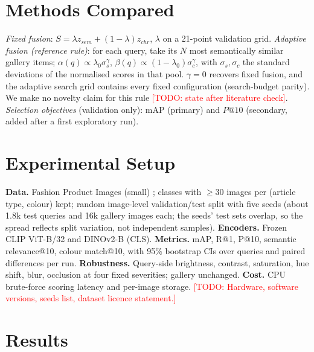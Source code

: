 \documentclass[11pt]{article}
\newcommand{\todo}[1]{\textcolor{red}{[TODO: #1]}}
\begin{document}
\section{Methods Compared}
\emph{Fixed fusion}: $S=\lambda z_{sem}+(1-\lambda)z_{chr}$, $\lambda$ on a 21-point validation grid.
\emph{Adaptive fusion (reference rule)}: for each query, take its $N$ most semantically similar gallery items; $\alpha(q)\propto\lambda_0\sigma_s^{\gamma}$, $\beta(q)\propto(1-\lambda_0)\sigma_c^{\gamma}$, with $\sigma_s,\sigma_c$ the standard deviations of the normalised scores in that pool. $\gamma=0$ recovers fixed fusion, and the adaptive search grid contains every fixed configuration (search-budget parity). We make no novelty claim for this rule \todo{state after literature check}.
\emph{Selection objectives} (validation only): mAP (primary) and $P@10$ (secondary, added after a first exploratory run).

\section{Experimental Setup}
\textbf{Data.} Fashion Product Images (small) \cite{TODO}; classes with $\ge30$ images per (article type, colour) kept; random image-level validation/test split with five seeds (about 1.8k test queries and 16k gallery images each; the seeds' test sets overlap, so the spread reflects split variation, not independent samples). \textbf{Encoders.} Frozen CLIP ViT-B/32 and DINOv2-B (CLS). \textbf{Metrics.} mAP, R@1, P@10, semantic relevance@10, colour match@10, with 95\% bootstrap CIs over queries and paired differences per run. \textbf{Robustness.} Query-side brightness, contrast, saturation, hue shift, blur, occlusion at four fixed severities; gallery unchanged. \textbf{Cost.} CPU brute-force scoring latency and per-image storage.
\todo{Hardware, software versions, seeds list, dataset licence statement.}

\section{Results}
\end{document}
